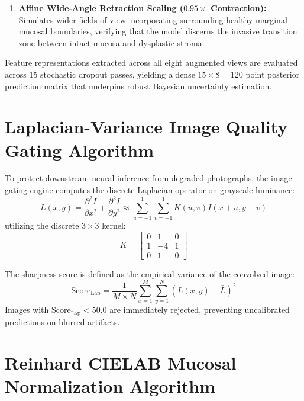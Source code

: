 \documentclass[12pt,a4paper,oneside]{report}
\begin{document}
\begin{enumerate}[label=\textbf{Pass \arabic*:}, leftmargin=*]
    \item \textbf{Affine Wide-Angle Retraction Scaling ($0.95\times$ Contraction):} \\
    Simulates wider fields of view incorporating surrounding healthy marginal mucosal boundaries, verifying that the model discerns the invasive transition zone between intact mucosa and dysplastic stroma.
\end{enumerate}

Feature representations extracted across all eight augmented views are evaluated across 15 stochastic dropout passes, yielding a dense $15 \times 8 = 120$ point posterior prediction matrix that underpins robust Bayesian uncertainty estimation.

\section{Laplacian-Variance Image Quality Gating Algorithm}
\label{sec:laplacian_impl}

To protect downstream neural inference from degraded photographs, the image gating engine computes the discrete Laplacian operator on grayscale luminance:
\begin{equation}
    L(x, y) = \frac{\partial^2 I}{\partial x^2} + \frac{\partial^2 I}{\partial y^2} \approx \sum_{u=-1}^{1} \sum_{v=-1}^{1} K(u, v) I(x+u, y+v)
\end{equation}
utilizing the discrete $3\times 3$ kernel:
\begin{equation}
    K = \begin{bmatrix}
        0 & 1 & 0 \\
        1 & -4 & 1 \\
        0 & 1 & 0
    \end{bmatrix}
\end{equation}

The sharpness score is defined as the empirical variance of the convolved image:
\begin{equation}
    \text{Score}_{\text{Lap}} = \frac{1}{M \times N} \sum_{x=1}^{M} \sum_{y=1}^{N} \left( L(x, y) - \bar{L} \right)^2
\end{equation}
Images with $\text{Score}_{\text{Lap}} < 50.0$ are immediately rejected, preventing uncalibrated predictions on blurred artifacts.

\section{Reinhard CIELAB Mucosal Normalization Algorithm}
\label{sec:reinhard_impl}
\end{document}
